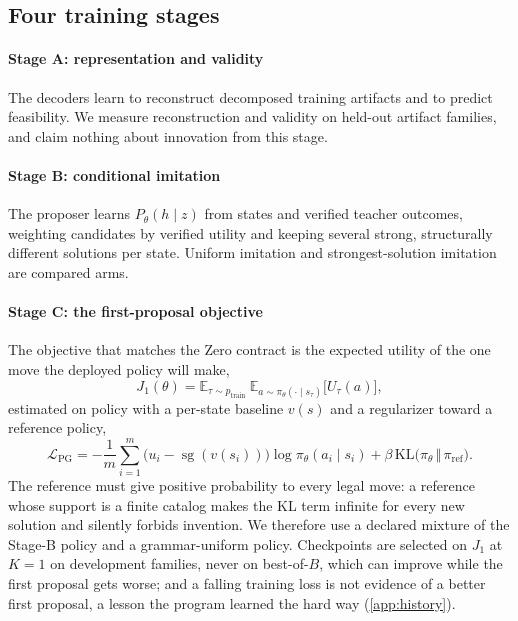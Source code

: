 \subsection{Four training stages}

\paragraph{Stage A: representation and validity} The decoders learn to reconstruct decomposed
training artifacts and to predict feasibility. We measure reconstruction and validity on held-out
artifact families, and claim nothing about innovation from this stage.

\paragraph{Stage B: conditional imitation} The proposer learns $P_\theta(h\mid z)$ from states and
verified teacher outcomes, weighting candidates by verified utility and keeping several strong,
structurally different solutions per state. Uniform imitation and strongest-solution imitation are
compared arms.

\paragraph{Stage C: the first-proposal objective} The objective that matches the Zero contract is the
expected utility of the one move the deployed policy will make,
\begin{equation}
J_1(\theta)=\mathbb E_{\tau\sim p_{\mathrm{train}}}\ \mathbb E_{a\sim\pi_\theta(\cdot\mid s_\tau)}\bigl[U_\tau(a)\bigr],
\label{eq:j1}
\end{equation}
estimated on policy with a per-state baseline $v(s)$ and a regularizer toward a reference policy,
\begin{equation}
\mathcal L_{\mathrm{PG}}=-\frac1m\sum_{i=1}^{m}\bigl(u_i-\operatorname{sg}(v(s_i))\bigr)\log\pi_\theta(a_i\mid s_i)
+\beta\,\mathrm{KL}\bigl(\pi_\theta\,\Vert\,\pi_{\mathrm{ref}}\bigr).
\label{eq:pg}
\end{equation}
The reference must give positive probability to every legal move: a reference whose support is a
finite catalog makes the KL term infinite for every new solution and silently forbids invention. We
therefore use a declared mixture of the Stage-B policy and a grammar-uniform policy. Checkpoints are
selected on $J_1$ at $K=1$ on development families, never on best-of-$B$, which can improve while the
first proposal gets worse; and a falling training loss is not evidence of a better first proposal,
a lesson the program learned the hard way (\cref{app:history}).

